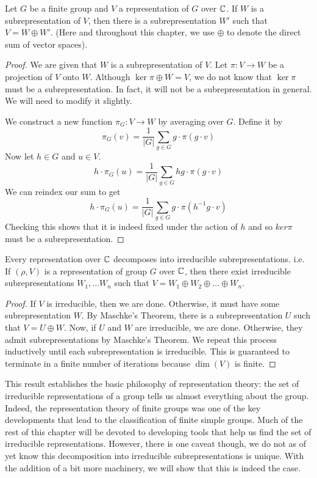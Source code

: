 \begin{theorem}
    Let $G$ be a finite group and $V$ a representation of $G$ over $\mathbb{C}$. If $W$ is a subrepresentation of $V$, then 
there is a subrepresentation $W'$ such that $V = W \oplus W'$. (Here and throughout this chapter, we use $\oplus$ 
to denote the direct sum of vector spaces).
\end{theorem}


\begin{proof}
    We are given that $W$ is a subrepresentation of $V$. Let $\pi : V \rightarrow W$ be a projection of $V$ onto 
    $W$. Although $\ker \pi \oplus W = V$, we do not know that $\ker \pi$ must be a subrepresentation. In fact, it 
    will not be a subrepresentation in general. We will need to modify it slightly.

    We construct a new function $\pi_G : V \rightarrow W$ by averaging over $G$. Define it by
    \[
        \pi_G(v) = \frac{1}{|G|}\sum_{g \in G} g \cdot \pi(g \cdot v) \]
    Now let $h \in G$ and $u \in V$.
    \[
        h \cdot \pi_G(u) = \frac{1}{|G|} \sum_{g \in G} hg \cdot \pi(g \cdot v)
    \]
    We can reindex our sum to get
    \[
        h \cdot \pi_G (u) = \frac{1}{|G|} \sum_{g \in G} g \cdot \pi(h^{-1}g \cdot v)
    \]
    Checking this shows that it is indeed fixed under the action of $h$ and so $ker \pi$ must be a 
    subrepresentation.
\end{proof}



\begin{theorem}
    Every representation over $\mathbb{C}$ decomposes into irreducible subrepresentations. i.e.
    If $(\rho, V)$ is a representation of group $G$ over $\mathbb{C}$, then there exist irreducible subrepresentations 
    $W_1, ...  W_n$ such that $V = W_1 \oplus W_2 \oplus ... \oplus W_n$.
\end{theorem}

\begin{proof}
    If $V$ is irreducible, then we are done. Otherwise, it must have some subrepresentation $W$. By Maschke's 
    Theorem, there is a subrepresentation $U$ such that $V = U \oplus W$. Now, if $U$ and $W$ are irreducible, we 
    are done. Otherwise, they admit subrepresentations by Maschke's Theorem. We repeat this process inductively 
    until each subrepresentation is irreducible. This is guaranteed to terminate in a finite number of iterations 
    because $\dim(V)$ is finite.
\end{proof}
This result establishes the basic philosophy of representation theory: the set of irreducible representations of a 
group tells us almost everything about the group.  Indeed, the representation theory of finite groups was one of 
the key developments that lead to the classification of finite simple groups.  Much of the rest of this chapter 
will be devoted to developing tools that help us find the set of irreducible representations. However, there is one 
caveat though, we do not as of yet know this decomposition into irreducible subrepresentations is unique. With the 
addition of a bit more machinery, we will show that this is indeed the case.
 
